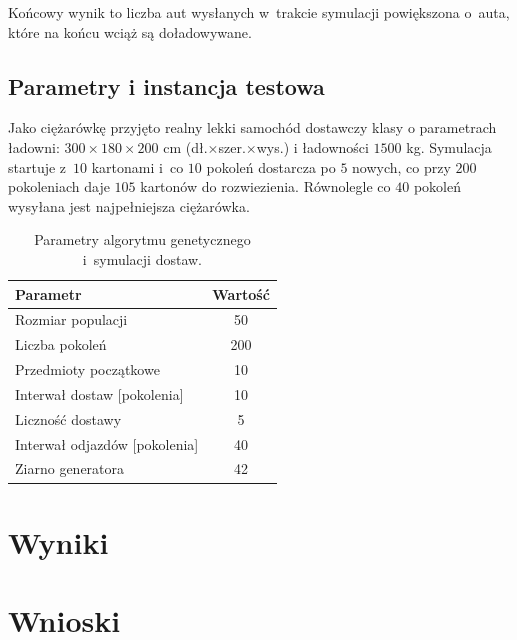 \documentclass[12pt]{article}
\begin{document}
 Końcowy wynik to liczba aut wysłanych w~trakcie symulacji powiększona o~auta, które na końcu wciąż są doładowywane.

\subsection{Parametry i instancja testowa}

Jako ciężarówkę przyjęto realny lekki samochód dostawczy klasy o parametrach ładowni: $300\times180\times200$ cm (dł.$\times$szer.$\times$wys.) i ładowności $1500$ kg.
Symulacja startuje z~$10$ kartonami i~co $10$ pokoleń dostarcza po $5$ nowych, co przy $200$ pokoleniach daje $105$ kartonów do rozwiezienia. Równolegle co $40$ pokoleń wysyłana jest najpełniejsza ciężarówka.

\begin{table}[H]
\centering
\begin{tabular}{lc}
\toprule
Parametr & Wartość \\
\midrule
Rozmiar populacji & 50 \\
Liczba pokoleń & 200 \\
Przedmioty początkowe & 10 \\
Interwał dostaw [pokolenia] & 10 \\
Liczność dostawy & 5 \\
Interwał odjazdów [pokolenia] & 40 \\
Ziarno generatora & 42 \\
\bottomrule
\end{tabular}
\caption{Parametry algorytmu genetycznego i~symulacji dostaw.}
\end{table}

\section{Wyniki}

\section{Wnioski}
\end{document}

